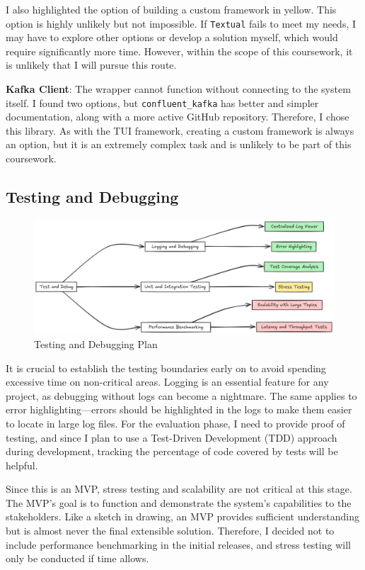\documentclass[10pt , a4paper]{report}
\begin{document}
I also highlighted the option of building a custom framework in yellow. This option is highly unlikely but not impossible. If \texttt{Textual} fails to meet my needs, I may have to explore other options or develop a solution myself, which would require significantly more time. However, within the scope of this coursework, it is unlikely that I will pursue this route.

\textbf{Kafka Client}: The wrapper cannot function without connecting to the system itself. I found two options, but \texttt{confluent\_kafka} has better and simpler documentation, along with a more active GitHub repository. Therefore, I chose this library. As with the TUI framework, creating a custom framework is always an option, but it is an extremely complex task and is unlikely to be part of this coursework.

\subsection{Testing and Debugging}

\begin{figure}[htbp]
    \centering
    \includegraphics[width=1\linewidth]{imgs/TestDebugDiagram.png}
    \caption{Testing and Debugging Plan}
    \label{fig:test_debug}
\end{figure}

It is crucial to establish the testing boundaries early on to avoid spending excessive time on non-critical areas. Logging is an essential feature for any project, as debugging without logs can become a nightmare. The same applies to error highlighting—errors should be highlighted in the logs to make them easier to locate in large log files. For the evaluation phase, I need to provide proof of testing, and since I plan to use a Test-Driven Development (TDD) approach during development, tracking the percentage of code covered by tests will be helpful.

Since this is an MVP, stress testing and scalability are not critical at this stage. The MVP's goal is to function and demonstrate the system's capabilities to the stakeholders. Like a sketch in drawing, an MVP provides sufficient understanding but is almost never the final extensible solution. Therefore, I decided not to include performance benchmarking in the initial releases, and stress testing will only be conducted if time allows.
\end{document}
